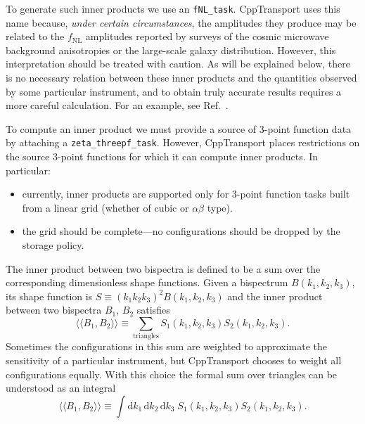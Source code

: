 \documentclass[11pt,a4paper]{article}
\renewcommand{\d}{\mathrm{d}}
\newcommand{\fNL}{f_{\mathrm{NL}}}
\newcommand{\packagefont}{\sffamily}
\newcommand{\CppTransport}{{\packagefont CppTransport}}
\newcommand{\iprod}[2]{\langle\!\langle {#1}, {#2} \rangle\!\rangle}
\begin{document}
To generate such inner products we use an
\texttt{fNL_task}.
{\CppTransport} uses this name because, \emph{under certain circumstances},
the amplitudes they produce may be related to the $\fNL$ amplitudes
reported by surveys of the cosmic microwave background anisotropies
or the large-scale galaxy distribution.
However, this interpretation should be treated with caution.
As will be explained below,
there is no necessary relation between these inner products and
the quantities observed by some particular instrument,
and to obtain truly accurate results requires a more careful calculation.
For an example, see Ref.~\cite{Byrnes:2015dub}.

To compute an inner product
we must provide a source of 3-point function
data by attaching a \texttt{zeta_threepf_task}.
However, {\CppTransport} places restrictions on the
source 3-point functions for which it can compute inner products.
In particular:
\begin{itemize}
	\item currently, inner products are supported only for
	3-point function tasks built from a linear grid
	(whether of cubic or $\alpha\beta$ type).
	\item the grid should be complete---no configurations should
	be dropped by the storage policy.
\end{itemize}

The inner product between two bispectra is defined to be
a sum over the corresponding dimensionless shape functions.
Given a bispectrum $B(k_1, k_2, k_3)$, its shape function is
$S \equiv (k_1 k_2 k_3)^2 B(k_1, k_2, k_3)$
and the inner product between two bispectra
$B_1$, $B_2$ satisfies~\cite{Babich:2004gb,Fergusson:2009nv}
\begin{equation}
	\iprod{B_1}{B_2} \equiv
	\sum_{\text{triangles}}
	S_1(k_1, k_2, k_3) S_2(k_1, k_2, k_3) .	
	\label{eq:inner-product}
\end{equation}
Sometimes the configurations in this sum are weighted
to approximate the sensitivity of a particular instrument,
but {\CppTransport} chooses to weight all configurations equally.
With this choice
the formal sum over triangles can be understood as an integral
\begin{equation}
	\iprod{B_1}{B_2} \equiv
	\int \d k_1 \, \d k_2 \, \d k_3 \;
	S_1(k_1, k_2, k_3) S_2(k_1, k_2, k_3) .	
\end{equation}
\end{document}
